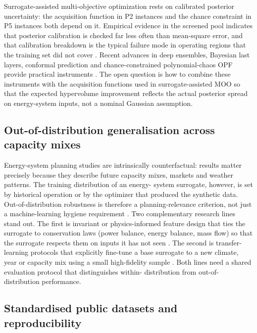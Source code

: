 Surrogate-assisted multi-objective optimization rests on calibrated
posterior uncertainty: the acquisition function in P2 instances and
the chance constraint in P5 instances both depend on it. Empirical
evidence in the screened pool indicates that posterior calibration is
checked far less often than mean-square error, and that calibration
breakdown is the typical failure mode in operating regions that the
training set did not cover
\cite{Hu2020,Hu2021671,Volodina2022,Lawson201647,Hu2024,Buchanan2024,Subedi2026157}.
Recent advances in deep ensembles, Bayesian last layers, conformal
prediction and chance-constrained polynomial-chaos OPF provide
practical instruments
\cite{Chen2023657,Liang20246508,Muhlpfordt20194806,Koirala20242284,Xu20212696}.
The open question is how to combine these instruments with the
acquisition functions used in surrogate-assisted MOO so that the
expected hypervolume improvement reflects the actual posterior
spread on energy-system inputs, not a nominal Gaussian assumption.

\subsection{Out-of-distribution generalisation across capacity mixes}
\label{sec:ch:ood}

Energy-system planning studies are intrinsically counterfactual:
results matter precisely because they describe future capacity mixes,
markets and weather patterns. The training distribution of an energy-
system surrogate, however, is set by historical operation or by the
optimizer that produced the synthetic data. Out-of-distribution
robustness is therefore a planning-relevance criterion, not just a
machine-learning hygiene requirement
\cite{Park2019,Reynolds2017704,Subedi2026157,Khaloie2025,Lim2025,Starke2025214,Mylonopoulos202332697}.
Two complementary research lines stand out. The first is invariant or
physics-informed feature design that ties the surrogate to
conservation laws (power balance, energy balance, mass flow) so that
the surrogate respects them on inputs it has not seen
\cite{Park2019,Su2022315,Liu20223726,Petrova2025,Du2025}. The second
is transfer-learning protocols that explicitly fine-tune a base
surrogate to a new climate, year or capacity mix using a small
high-fidelity sample
\cite{Chen202514792,De Castro20247710,Khayambashi202453}. Both lines
need a shared evaluation protocol that distinguishes within-
distribution from out-of-distribution performance.

\subsection{Standardised public datasets and reproducibility}
\label{sec:ch:data}

